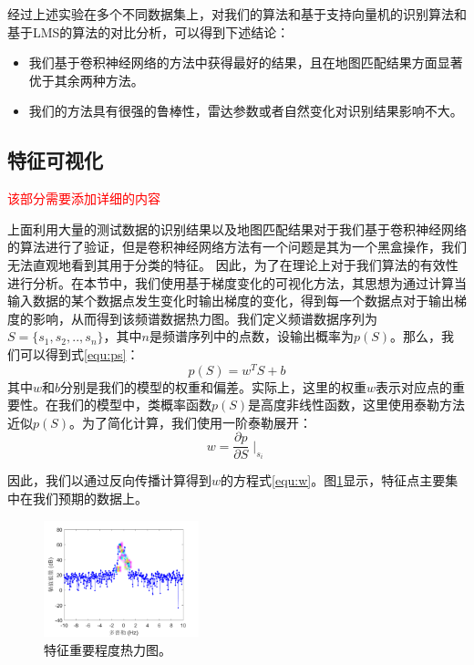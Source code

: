 经过上述实验在多个不同数据集上，对我们的算法和基于支持向量机的识别算法和基于LMS的算法的对比分析，可以得到下述结论：
\begin{itemize}
	\item 我们基于卷积神经网络的方法中获得最好的结果，且在地图匹配结果方面显著优于其余两种方法。
	\item 我们的方法具有很强的鲁棒性，雷达参数或者自然变化对识别结果影响不大。
\end{itemize}

\subsection{特征可视化}
\textcolor{red}{该部分需要添加详细的内容}

上面利用大量的测试数据的识别结果以及地图匹配结果对于我们基于卷积神经网络的算法进行了验证，但是卷积神经网络方法有一个问题是其为一个黑盒操作，我们无法直观地看到其用于分类的特征。
因此，为了在理论上对于我们算法的有效性进行分析。在本节中，我们使用基于梯度变化的可视化方法，其思想为通过计算当输入数据的某个数据点发生变化时输出梯度的变化，得到每一个数据点对于输出梯度的影响，从而得到该频谱数据热力图。我们定义频谱数据序列为$ S = \{s_1, s_2, .., s_n\} $，其中$n$是频谱序列中的点数，设输出概率为$p(S)$。那么，我们可以得到式\ref{equ:ps}：
\begin{equation}
	p(S) = w^TS+b
	\label{equ:ps}
\end{equation}
其中$ w $和$ b $分别是我们的模型的权重和偏差。实际上，这里的权重$ w $表示对应点的重要性。在我们的模型中，类概率函数$p(S)$是高度非线性函数，这里使用泰勒方法近似$p(S)$。为了简化计算，我们使用一阶泰勒展开：
\begin{equation}
	w = \frac{\partial{p}}{\partial{S}}{\mid}_{s_i}
	\label{equ:w}
\end{equation}

因此，我们以通过反向传播计算得到$ w $的方程式\ref{equ:w}。图\ref{fig:vis}显示，特征点主要集中在我们预期的数据上。
\begin{figure}[H]
	\centering
	\includegraphics[width=0.4\textwidth]{figures/othr/heatmap.pdf}
	\caption{特征重要程度热力图。}
	\label{fig:vis}
\end{figure}


